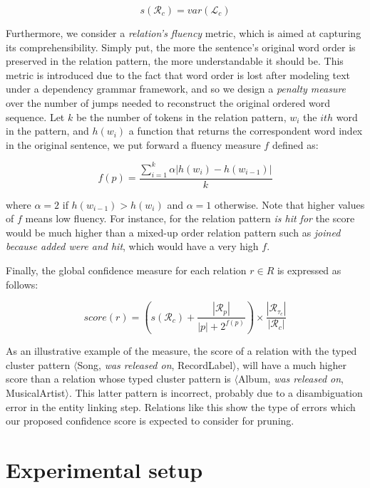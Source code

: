 \begin{equation}
s(\mathcal{R}_c) = var(\mathcal{L}_c)
\end{equation}

Furthermore, we consider a \textit{relation's fluency} metric, which is aimed at capturing its comprehensibility. Simply put, the more the sentence's original word order is preserved in the relation pattern, the more understandable it should be. This metric is introduced due to the fact that word order is lost after modeling text under a dependency grammar framework, and so we design a \textit{penalty measure} over the number of jumps needed to reconstruct the original ordered word sequence. Let $k$ be the number of tokens in the relation pattern, $w_i$ the $ith$ word in the pattern, and $h(w_i)$ a function that returns the correspondent word index in the original sentence, we put forward a fluency measure $f$ defined as:

\begin{equation}
f(p) = \frac{\sum_{i=1}^{k} \alpha | h(w_i) - h(w_{i-1}) |}{k}
\end{equation}

where $\alpha=2$ if $h(w_{i-1}) > h(w_i)$ and $\alpha=1$ otherwise. Note that higher values of $f$ means low fluency. For instance, for the relation pattern \textit{is hit for} the score would be much higher than a mixed-up order relation pattern such as \textit{joined because added were and hit}, which would have a very high $f$.  

Finally, the global confidence measure for each relation $r \in R$ is expressed as follows:

\begin{equation}
score(r) = \left({s(\mathcal{R}_c) + \frac{|\mathcal{R}_p|}{|p|+2^{f(p)}}}\right) \times {\frac{|\mathcal{R}_{\tau_c}|}{|\mathcal{R}_c|}}
\end{equation}

As an illustrative example of the measure, the score of a relation with the typed cluster pattern $\langle$Song, \textit{was released on}, RecordLabel$\rangle$, will have a much higher score than a relation whose typed cluster pattern is $\langle$Album, \textit{was released on}, MusicalArtist$\rangle$. This latter pattern is incorrect, probably due to a disambiguation error in the entity linking step. Relations like this show the type of errors which our proposed confidence score is expected to consider for pruning.



\section{Experimental setup}\label{sec:kb:exp}

